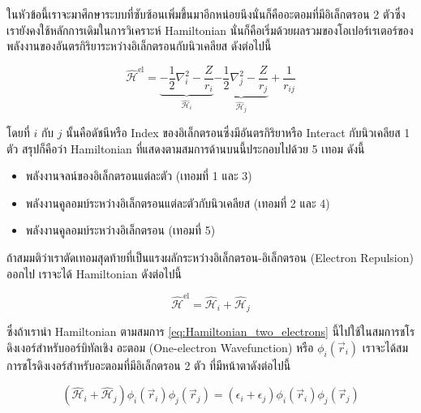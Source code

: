 ในหัวข้อนี้เราจะมาศึกษาระบบที่ซับซ้อนเพิ่มขึ้นมาอีกหน่อยนึงนั่นก็คืออะตอมที่มีอิเล็กตรอน 2 ตัวซึ่งเรายังคงใช้หลักการเดิมในการวิเคราะห์ Hamiltonian 
นั่นก็คือเริ่มด้วยผลรวมของโอเปอร์เรเตอร์ของพลังงานของอันตรกิริยาระหว่างอิเล็กตรอนกับนิวเคลียส ดังต่อไปนี้

\begin{equation}
    \hat{\mathscr{H}}^{\text{el}} 
    = 
    \underbrace{
        -\frac{1}{2} \nabla^{2}_{i} 
        -\frac{Z}{r_{i}}}
        _{\hat{\mathscr{H}}_{i}}
    \underbrace{
        -\frac{1}{2} \nabla^{2}_{j} 
        -\frac{Z}{r_{j}}}
        _{\hat{\mathscr{H}}_{j}}
    +\frac{1}{r_{ij}}
\end{equation}

\noindent โดยที่ $i$ กับ $j$ นั้นคือดัชนีหรือ Index ของอิเล็กตรอนซึ่งมีอันตรกิริยาหรือ Interact กับนิวเคลียส 1 ตัว สรุปก็คือว่า 
Hamiltonian ที่แสดงตามสมการด้านบนนี้ประกอบไปด้วย 5 เทอม ดังนี้

\begin{itemize}[topsep=0pt,noitemsep]
    \setlength\itemsep{1em}
    \item พลังงานจลน์ของอิเล็กตรอนแต่ละตัว (เทอมที่ 1 และ 3)
    
    \item พลังงานคูลอมบ์ระหว่างอิเล็กตรอนแต่ละตัวกับนิวเคลียส (เทอมที่ 2 และ 4)
    
    \item พลังงานคูลอมบ์ระหว่างอิเล็กตรอน (เทอมที่ 5)
\end{itemize}

ถ้าสมมติว่าเราตัดเทอมสุดท้ายที่เป็นแรงผลักระหว่างอิเล็กตรอน-อิเล็กตรอน (Electron Repulsion) ออกไป เราจะได้ Hamiltonian ดังต่อไปนี้

\begin{equation}
    \label{eq:Hamiltonian_two_electrons}
    \hat{\mathscr{H}}^{\text{el}} = \hat{\mathscr{H}}_{i} + \hat{\mathscr{H}}_{j}
\end{equation}

\noindent ซึ่งถ้าเรานำ Hamiltonian ตามสมการ \ref{eq:Hamiltonian_two_electrons} นี้ไปใช้ในสมการชโรดิงเงอร์สำหรับออร์บิทัลเชิง%
อะตอม (One-electron Wavefunction) หรือ $\phi_{i}(\vec{r}_{i})$ เราจะได้สมการชโรดิงเงอร์สำหรับอะตอมที่มีอิเล็กตรอน 2 ตัว 
ที่มีหน้าตาดังต่อไปนี้

\begin{equation}
    \left( \hat{\mathscr{H}}_{i} + \hat{\mathscr{H}}_{j} \right)
    \phi_{i}(\vec{r}_{i})
    \phi_{j}(\vec{r}_{j}) 
    =
    \left( \epsilon_{i} + \epsilon_{j} \right)
    \phi_{i}(\vec{r}_{i})
    \phi_{j}(\vec{r}_{j})     
\end{equation}

